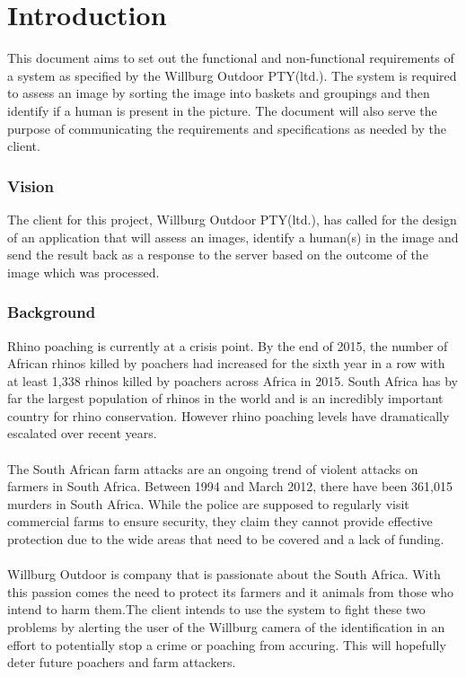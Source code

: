 \documentclass[a4paper,12pt]{report}
\begin{document}
\section{Introduction}
This document aims to set out the functional and non-functional requirements of a system as specified by the Willburg Outdoor PTY(ltd.). The system is required to assess an image by sorting the image into baskets and groupings and then identify if a human is present in the picture. The document will also serve the purpose of communicating the requirements and specifications as needed by the client.

 \subsubsection{Vision}
 The client for this project, Willburg Outdoor PTY(ltd.), has called for the design of an application that will assess an images, identify a human(s) in the image and send the result back as a response to the server based on the outcome of the image which was processed.

\subsubsection{Background}
Rhino poaching is currently at a crisis point. By the end of 2015, the number of African rhinos killed by poachers had increased for the sixth year in a row with at least 1,338 rhinos killed by poachers across Africa in 2015. South Africa has by far the largest population of rhinos in the world and is an incredibly important country for rhino conservation. However rhino poaching levels have dramatically escalated over recent years. \\
\\The South African farm attacks are an ongoing trend of violent attacks on farmers in South Africa. Between 1994 and March 2012, there have been 361,015 murders in South Africa. While the police are supposed to regularly visit commercial farms to ensure security, they claim they cannot provide effective protection due to the wide areas that need to be covered and a lack of funding.\\
\\Willburg Outdoor is company that is passionate about the South Africa. With this passion comes the need to protect its farmers and it animals from those who intend to harm them.The client intends to use the system to fight these two problems by alerting the user of the Willburg camera of the identification in an effort to potentially stop a crime or poaching from accuring. This will hopefully deter future poachers and farm attackers.
\end{document}
